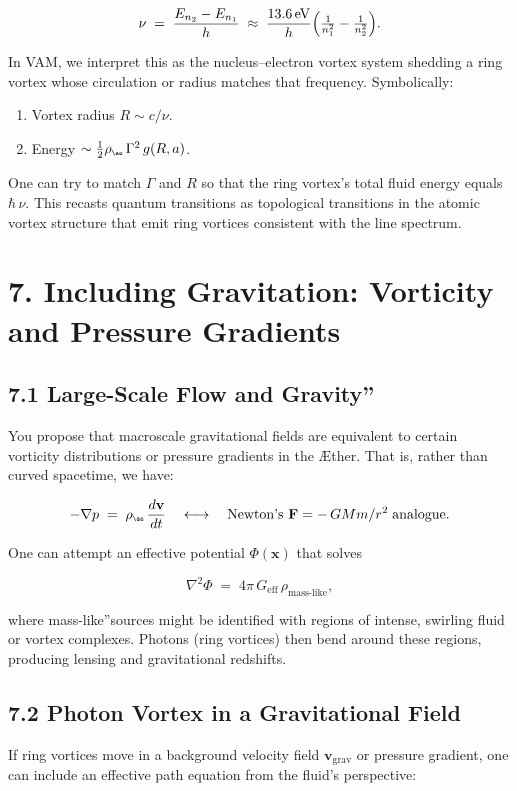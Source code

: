 \documentclass[a4paper,12pt]{article}
\begin{document}
\[
 \nu \;=\; \frac{E_{n_2}-E_{n_1}}{h} \;\approx\; \frac{13.6\,\mathrm{eV}}{h} \Bigl(\tfrac{1}{n_1^2}-\tfrac{1}{n_2^2}\Bigr).
\]

In VAM, we interpret this as the nucleus–electron vortex system shedding a ring vortex whose circulation or radius matches that frequency. Symbolically:

\begin{enumerate}
 \item Vortex radius \(R \sim c/\nu\).
 \item Energy \(\sim \tfrac12 \rho_{\scriptscriptstyle\mathrm{\ae}}\,\Gamma^2\,g(R,a)\).
\end{enumerate}

One can try to match \(\Gamma\) and \(R\) so that the ring vortex's total fluid energy equals \(\hbar\,\nu\). This recasts quantum transitions as topological transitions in the atomic vortex structure that emit ring vortices consistent with the line spectrum.

\section*{7. Including Gravitation: Vorticity and Pressure Gradients}
\subsection*{7.1 Large-Scale Flow and \grqq Gravity\textquotedblright}
You propose that macroscale gravitational fields are equivalent to certain vorticity distributions or pressure gradients in the Æther. That is, rather than curved spacetime, we have:

\[
 -\nabla p \;=\; \rho_{\scriptscriptstyle \mathrm{\ae}}\, \frac{d\mathbf{v}}{dt} \quad\longleftrightarrow\quad \text{Newton's } \mathbf{F}=-\,GMm/r^2\;\text{analogue}.
\]

One can attempt an effective potential \(\Phi(\mathbf{x})\) that solves

\[
 \nabla^2 \Phi \;=\; 4\pi\,G_\text{eff}\,\rho_\text{mass-like},
\]

where \grqq mass-like\textquotedblright sources might be identified with regions of intense, swirling fluid or vortex complexes. Photons (ring vortices) then bend around these regions, producing lensing and gravitational redshifts.

\subsection*{7.2 Photon Vortex in a Gravitational Field}
If ring vortices move in a background velocity field \(\mathbf{v}_{\mathrm{grav}}\) or pressure gradient, one can include an effective path equation from the fluid's perspective:
\end{document}

